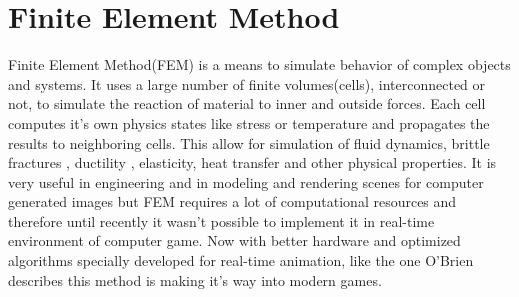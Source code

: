 \section{Finite Element Method}
Finite Element Method(FEM) is a means to simulate behavior of complex objects and systems.  It uses a large number of finite volumes(cells), interconnected or not, to simulate the reaction of material to inner and outside forces. Each cell computes it's own physics states like stress or temperature and propagates the results to neighboring cells. This allow for simulation of fluid dynamics, brittle fractures \cite{brittlefracture}, ductility \cite{ductilefracture}, elasticity, heat transfer and other physical properties. It is very useful in engineering and in modeling and rendering scenes for computer generated images but FEM requires a lot of computational resources and therefore until recently it wasn't possible to implement it in real-time environment of computer game. Now with better hardware and optimized algorithms specially developed for real-time animation, like the one O'Brien \cite{femingames} describes this method is making it's way into modern games.




